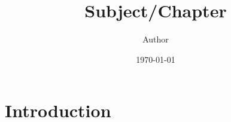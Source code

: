\documentclass{article}
\title{Subject/Chapter}
\author{Author}
\date{\today}
\begin{document}
\maketitle
\tableofcontents

\section{Introduction}
\end{document}
